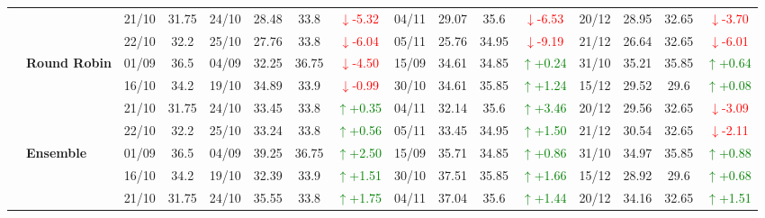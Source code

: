 \documentclass{ieeeaccess}
\begin{document}
{\begin{longtable}{llcc|cccc|cccc|cccc}
&
& 21/10 & 31.75 & 24/10 & 28.48 & 33.8 & \textcolor{red}{\(\downarrow\)-5.32} & 04/11 & 29.07 & 35.6 & \textcolor{red}{\(\downarrow\)-6.53} & 20/12 & 28.95 & 32.65 & \textcolor{red}{\(\downarrow\)-3.70} \\

&
& 22/10 & 32.2 & 25/10 & 27.76 & 33.8 & \textcolor{red}{\(\downarrow\)-6.04} & 05/11 & 25.76 & 34.95 & \textcolor{red}{\(\downarrow\)-9.19} & 21/12 & 26.64 & 32.65 & \textcolor{red}{\(\downarrow\)-6.01} \\
\cmidrule(lr){2-16}


& \textbf{Round Robin}
& 01/09 & 36.5 & 04/09 & 32.25 & 36.75 & \textcolor{red}{\(\downarrow\)-4.50} & 15/09 & 34.61 & 34.85 & \textcolor{green}{\(\uparrow\)+0.24} & 31/10 & 35.21 & 35.85 & \textcolor{green}{\(\uparrow\)+0.64} \\

&
& 16/10 & 34.2 & 19/10 & 34.89 & 33.9 & \textcolor{red}{\(\downarrow\)-0.99} & 30/10 & 34.61 & 35.85 & \textcolor{green}{\(\uparrow\)+1.24} & 15/12 & 29.52 & 29.6 & \textcolor{green}{\(\uparrow\)+0.08} \\

&
& 21/10 & 31.75 & 24/10 & 33.45 & 33.8 & \textcolor{green}{\(\uparrow\)+0.35} & 04/11 & 32.14 & 35.6 & \textcolor{green}{\(\uparrow\)+3.46} & 20/12 & 29.56 & 32.65 & \textcolor{red}{\(\downarrow\)-3.09} \\

&
& 22/10 & 32.2 & 25/10 & 33.24 & 33.8 & \textcolor{green}{\(\uparrow\)+0.56} & 05/11 & 33.45 & 34.95 & \textcolor{green}{\(\uparrow\)+1.50} & 21/12 & 30.54 & 32.65 & \textcolor{red}{\(\downarrow\)-2.11} \\
\cmidrule(lr){2-16}



& \textbf{Ensemble}
& 01/09 & 36.5 & 04/09 & 39.25 & 36.75 & \textcolor{green}{\(\uparrow\)+2.50} & 15/09 & 35.71 & 34.85 & \textcolor{green}{\(\uparrow\)+0.86} & 31/10 & 34.97 & 35.85 & \textcolor{green}{\(\uparrow\)+0.88} \\

&
& 16/10 & 34.2 & 19/10 & 32.39 & 33.9 & \textcolor{green}{\(\uparrow\)+1.51} & 30/10 & 37.51 & 35.85 & \textcolor{green}{\(\uparrow\)+1.66} & 15/12 & 28.92 & 29.6 & \textcolor{green}{\(\uparrow\)+0.68} \\

&
& 21/10 & 31.75 & 24/10 & 35.55 & 33.8 & \textcolor{green}{\(\uparrow\)+1.75} & 04/11 & 37.04 & 35.6 & \textcolor{green}{\(\uparrow\)+1.44} & 20/12 & 34.16 & 32.65 & \textcolor{green}{\(\uparrow\)+1.51} \\


\end{longtable}}
\end{document}
